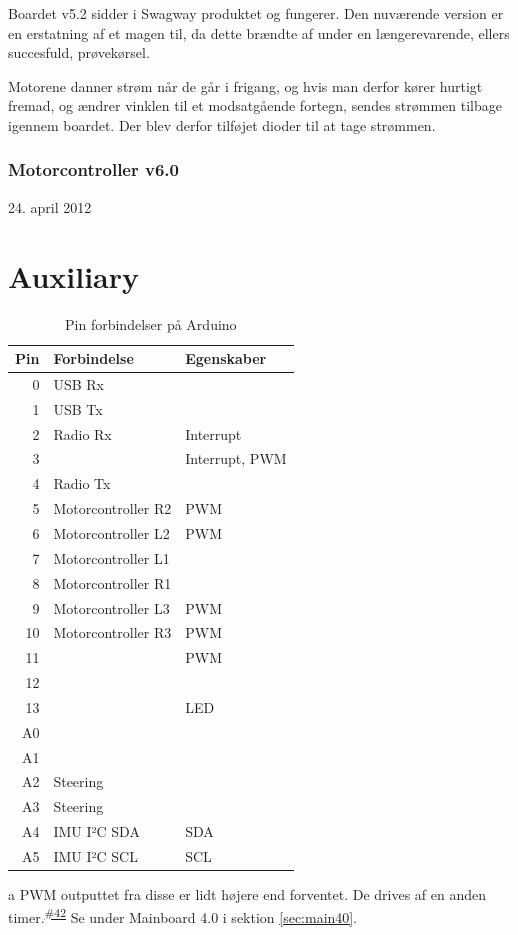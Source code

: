 \documentclass[a4paper,oneside,article,danish,table]{memoir}
\newcommand{\boarddate}[1]{\textcolor{blue!80!black}{#1}}
\newcommand{\issue}[1]{\textsuperscript{\textcolor{blue!80!black}{\href{https://github.com/neic/Swagway/issues/#1}{\##1}}}}
\begin{document}
Boardet v5.2 sidder i Swagway produktet og fungerer. Den nuværende version er en erstatning af et magen til, da dette brændte af under en længerevarende, ellers succesfuld, prøvekørsel.

Motorene danner strøm når de går i frigang, og hvis man derfor kører hurtigt fremad, og ændrer vinklen til et modsatgående fortegn, sendes strømmen tilbage igennem boardet. Der blev derfor tilføjet dioder til at tage strømmen.

\subsection{Motorcontroller v6.0}
\boarddate{24. april 2012}

\chapter{Auxiliary}
\begin{table}[htbp]
  \caption{Pin forbindelser på Arduino}
  \centering
  \begin{threeparttable}
    \begin{tabular}{rll}
      \toprule
      Pin & Forbindelse & Egenskaber\\
      \midrule
      0 & USB Rx & \\
      1 & USB Tx & \\
      2 & Radio Rx & Interrupt\\
      3 & & Interrupt, PWM\\
      4 & Radio Tx & \\
      5 & Motorcontroller R2 & PWM\tnote{a}\\
      6 & Motorcontroller L2 & PWM\tnote{a}\\
      7 & Motorcontroller L1 & \\
      8 & Motorcontroller R1 & \\
      9 & Motorcontroller L3 & PWM\\
      10 & Motorcontroller R3 & PWM\\
      11 & & PWM\\
      12 & & \\
      13 & & LED\\
      A0 & & \\
      A1 & & \\
      A2 & Steering & \\
      A3 & Steering & \\
      A4 & IMU I²C SDA & SDA\\
      A5 & IMU I²C SCL & SCL
    \end{tabular}
    \begin{tablenotes}
      \item[a]{PWM outputtet fra disse er lidt højere end forventet. De drives af en anden timer.\issue{42} Se under Mainboard 4.0 i sektion \ref{sec:main40}.}
    \end{tablenotes}
  \end{threeparttable}
\end{table}
\end{document}
